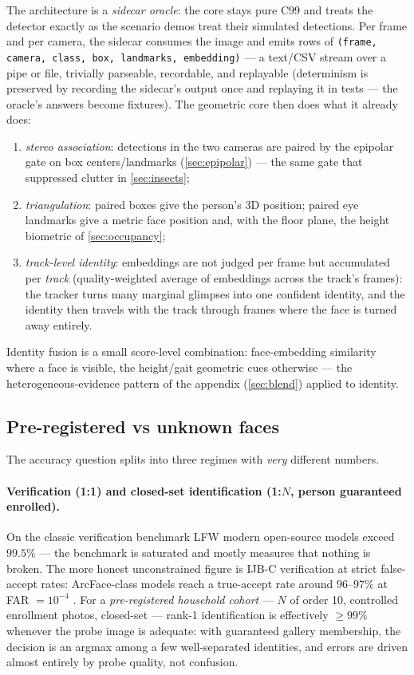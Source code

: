 \documentclass[11pt]{article}
\theoremstyle{definition}
\newcommand{\code}[1]{\texttt{#1}}
\begin{document}
The architecture is a \emph{sidecar oracle}: the core stays pure C99 and
treats the detector exactly as the scenario demos treat their simulated
detections. Per frame and per camera, the sidecar consumes the image and
emits rows of \code{(frame, camera, class, box, landmarks, embedding)} ---
a text/CSV stream over a pipe or file, trivially parseable, recordable,
and replayable (determinism is preserved by recording the sidecar's
output once and replaying it in tests --- the oracle's answers become
fixtures). The geometric core then does what it already does:
\begin{enumerate}
  \item \emph{stereo association}: detections in the two cameras are
        paired by the epipolar gate on box centers/landmarks
        (\autoref{sec:epipolar}) --- the same gate that suppressed
        clutter in \autoref{sec:insects};
  \item \emph{triangulation}: paired boxes give the person's 3D position;
        paired eye landmarks give a metric face position and, with the
        floor plane, the height biometric of \autoref{sec:occupancy};
  \item \emph{track-level identity}: embeddings are not judged per frame
        but accumulated per \emph{track} (quality-weighted average of
        embeddings across the track's frames): the tracker turns many
        marginal glimpses into one confident identity, and the identity
        then travels with the track through frames where the face is
        turned away entirely.
\end{enumerate}
Identity fusion is a small score-level combination: face-embedding
similarity where a face is visible, the height/gait geometric cues
otherwise --- the heterogeneous-evidence pattern of the appendix
(\autoref{sec:blend}) applied to identity.

\subsection{Pre-registered vs unknown faces}
\label{sec:openset}

The accuracy question splits into three regimes with \emph{very}
different numbers.

\paragraph{Verification (1:1) and closed-set identification (1:$N$,
person guaranteed enrolled).} On the classic verification benchmark LFW
\cite{Huang2007} modern open-source models exceed $99.5\%$ --- the
benchmark is saturated and mostly measures that nothing is broken. The
more honest unconstrained figure is IJB-C \cite{Maze2018} verification at
strict false-accept rates: ArcFace-class models reach a true-accept rate
around $96$--$97\%$ at FAR $=10^{-4}$ \cite{Deng2019}. For a
\emph{pre-registered household cohort} --- $N$ of order 10, controlled
enrollment photos, closed-set --- rank-1 identification is effectively
$\ge99\%$ whenever the probe image is adequate: with guaranteed gallery
membership, the decision is an argmax among a few well-separated
identities, and errors are driven almost entirely by probe quality, not
confusion.
\end{document}
